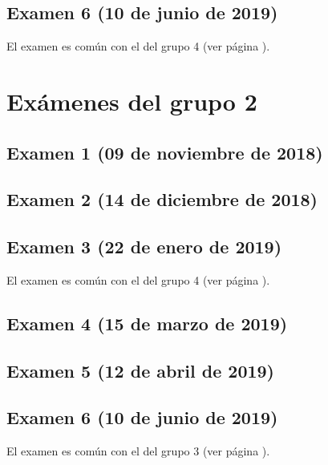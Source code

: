 \documentclass[a4paper,12pt,twoside]{book}
\begin{document}
\section{Examen 6 (10 de junio de 2019)}
El examen es común con el del grupo 4 (ver página \pageref{examen_18_19_4_6}).

\chapter{Exámenes del grupo 2}
\section{Examen 1 (09 de noviembre de 2018)}
\section{Examen 2 (14 de diciembre de 2018)}
\section{Examen 3 (22 de enero de 2019)}
El examen es común con el del grupo 4 (ver página \pageref{examen_18_19_4_3}).
\section{Examen 4 (15 de marzo de 2019)}
\section{Examen 5 (12 de abril de 2019)}
\section{Examen 6 (10 de junio de 2019)}
El examen es común con el del grupo 3 (ver página \pageref{examen_18_19_3_6}).
\end{document}
